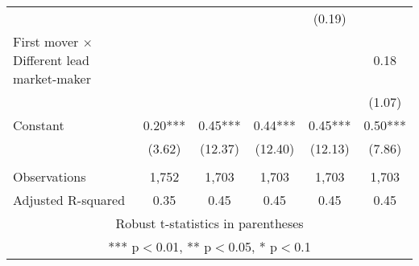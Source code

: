 \documentclass[]{article}
\begin{document}
\begin{tabular}{lccccc}
 &  &  &  & (0.19) &  \\
First mover $\times$ Different lead market-maker &  &  &  &  & 0.18 \\
 &  &  &  &  & (1.07) \\
Constant & 0.20*** & 0.45*** & 0.44*** & 0.45*** & 0.50*** \\
 & (3.62) & (12.37) & (12.40) & (12.13) & (7.86) \\
 &  &  &  &  &  \\
Observations & 1,752 & 1,703 & 1,703 & 1,703 & 1,703 \\
 Adjusted R-squared & 0.35 & 0.45 & 0.45 & 0.45 & 0.45 \\ \hline
\multicolumn{6}{c}{ Robust t-statistics in parentheses} \\
\multicolumn{6}{c}{ *** p$<$0.01, ** p$<$0.05, * p$<$0.1} \\
\end{tabular}
\end{document}
